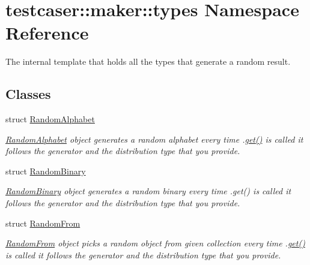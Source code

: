 \hypertarget{namespacetestcaser_1_1maker_1_1types}{}\section{testcaser\+:\+:maker\+:\+:types Namespace Reference}
\label{namespacetestcaser_1_1maker_1_1types}


The internal template that holds all the types that generate a random result.  


\subsection*{Classes}
\begin{DoxyCompactItemize}
\item 
struct \mbox{\hyperlink{structtestcaser_1_1maker_1_1types_1_1RandomAlphabet}{Random\+Alphabet}}
\begin{DoxyCompactList}\small\item\em \mbox{\hyperlink{structtestcaser_1_1maker_1_1types_1_1RandomAlphabet}{Random\+Alphabet}} object generates a random alphabet every time .\mbox{\hyperlink{structtestcaser_1_1maker_1_1types_1_1RandomAlphabet_a6498f1e44b84cb66c1c1dc6de642b218}{get()}} is called it follows the generator and the distribution type that you provide. \end{DoxyCompactList}\item 
struct \mbox{\hyperlink{structtestcaser_1_1maker_1_1types_1_1RandomBinary}{Random\+Binary}}
\begin{DoxyCompactList}\small\item\em \mbox{\hyperlink{structtestcaser_1_1maker_1_1types_1_1RandomBinary}{Random\+Binary}} object generates a random binary every time .get() is called it follows the generator and the distribution type that you provide. \end{DoxyCompactList}\item 
struct \mbox{\hyperlink{structtestcaser_1_1maker_1_1types_1_1RandomFrom}{Random\+From}}
\begin{DoxyCompactList}\small\item\em \mbox{\hyperlink{structtestcaser_1_1maker_1_1types_1_1RandomFrom}{Random\+From}} object picks a random object from given collection every time .\mbox{\hyperlink{structtestcaser_1_1maker_1_1types_1_1RandomFrom_a6f72354c54f49a18de70b057a3b0f04b}{get()}} is called it follows the generator and the distribution type that you provide. \end{DoxyCompactList}\item 

\end{DoxyCompactItemize}
